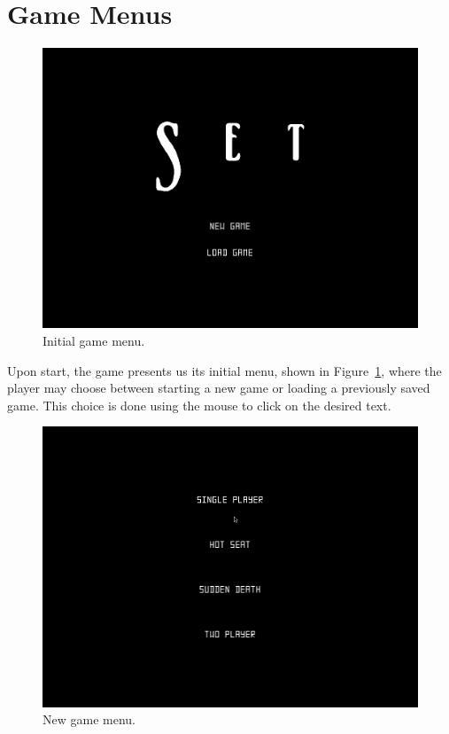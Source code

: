 \documentclass[11pt,a4paper,reqno]{report}
\numberwithin{equation}{section}
\begin{document}
\section{Game Menus}

\begin{figure}[htbp]
\begin{center}
\includegraphics[scale=0.3]{menu_init.png}
\caption{Initial game menu.}
\label{menu_init}
\end{center}
\end{figure}

Upon start, the game presents us its initial menu, shown in Figure~\ref{menu_init}, where the player may choose between starting a new game or loading a previously saved game. This choice is done using the mouse to click on the desired text.

\begin{figure}[htbp]
\begin{center}
\includegraphics[scale=0.3]{menu_new.png}
\caption{New game menu.}
\label{menu_new}
\end{center}
\end{figure}
\end{document}
